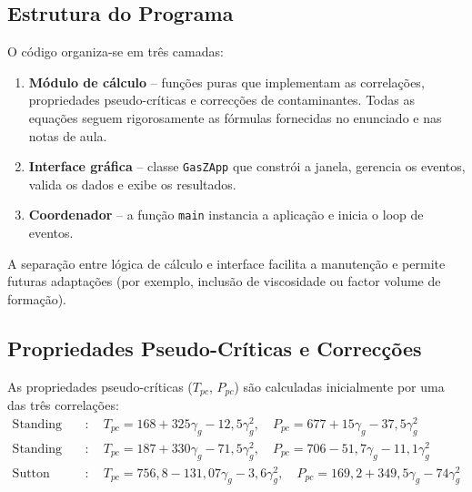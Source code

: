 \documentclass[a4paper,12pt]{article}
\begin{document}
\subsection{Estrutura do Programa}
O código organiza-se em três camadas:
\begin{enumerate}
    \item \textbf{Módulo de cálculo} – funções puras que implementam as correlações, propriedades pseudo-críticas e correcções de contaminantes. Todas as equações seguem rigorosamente as fórmulas fornecidas no enunciado e nas notas de aula.
    \item \textbf{Interface gráfica} – classe \texttt{GasZApp} que constrói a janela, gerencia os eventos, valida os dados e exibe os resultados.
    \item \textbf{Coordenador} – a função \texttt{main} instancia a aplicação e inicia o loop de eventos.
\end{enumerate}
A separação entre lógica de cálculo e interface facilita a manutenção e permite futuras adaptações (por exemplo, inclusão de viscosidade ou factor volume de formação).

\subsection{Propriedades Pseudo-Críticas e Correcções}
As propriedades pseudo-críticas (\(T_{pc}\), \(P_{pc}\)) são calculadas inicialmente por uma das três correlações:
\begin{align}
    \text{Standing (gás seco)} &: \quad T_{pc}=168+325\gamma_g-12{,}5\gamma_g^2,\quad P_{pc}=677+15\gamma_g-37{,}5\gamma_g^2 \\
    \text{Standing (gás húmido)} &: \quad T_{pc}=187+330\gamma_g-71{,}5\gamma_g^2,\quad P_{pc}=706-51{,}7\gamma_g-11{,}1\gamma_g^2 \\
    \text{Sutton (gás húmido)} &: \quad T_{pc}=756{,}8-131{,}07\gamma_g-3{,}6\gamma_g^2,\quad P_{pc}=169{,}2+349{,}5\gamma_g-74\gamma_g^2
\end{align}
\end{document}
